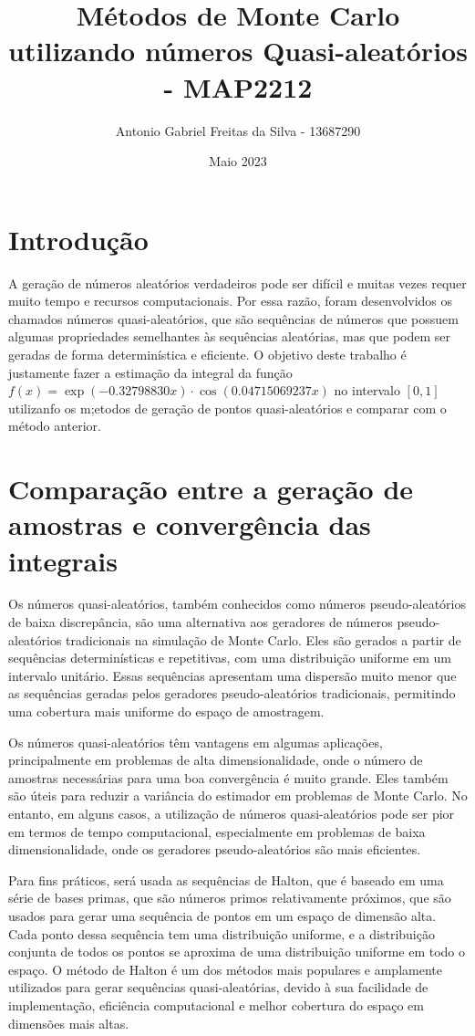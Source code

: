 \documentclass[a4paper]{article}
\title{Métodos de Monte Carlo utilizando números Quasi-aleatórios - MAP2212}
\author{Antonio Gabriel Freitas da Silva - 13687290}
\date{Maio 2023}
\begin{document}
\maketitle

\section{Introdução}

A geração de números aleatórios verdadeiros pode ser difícil e muitas vezes requer muito tempo e recursos computacionais. Por essa razão, foram desenvolvidos os chamados números quasi-aleatórios, que são sequências de números que possuem algumas propriedades semelhantes às sequências aleatórias, mas que podem ser geradas de forma determinística e eficiente. O objetivo deste trabalho é justamente fazer a estimação da integral da função $f(x) = \exp{(-0.32798830x)}\cdot\cos{(0.04715069237x)}$ no intervalo $[0,1]$ utilizanfo os m;etodos de geração de pontos quasi-aleatórios e comparar com o método anterior.

\section{Comparação entre a geração de amostras e convergência das integrais}

Os números quasi-aleatórios, também conhecidos como números pseudo-aleatórios de baixa discrepância, são uma alternativa aos geradores de números pseudo-aleatórios tradicionais na simulação de Monte Carlo. Eles são gerados a partir de sequências determinísticas e repetitivas, com uma distribuição uniforme em um intervalo unitário. Essas sequências apresentam uma dispersão muito menor que as sequências geradas pelos geradores pseudo-aleatórios tradicionais, permitindo uma cobertura mais uniforme do espaço de amostragem.

Os números quasi-aleatórios têm vantagens em algumas aplicações, principalmente em problemas de alta dimensionalidade, onde o número de amostras necessárias para uma boa convergência é muito grande. Eles também são úteis para reduzir a variância do estimador em problemas de Monte Carlo. No entanto, em alguns casos, a utilização de números quasi-aleatórios pode ser pior em termos de tempo computacional, especialmente em problemas de baixa dimensionalidade, onde os geradores pseudo-aleatórios são mais eficientes.

Para fins práticos, será usada as sequências de Halton, que é baseado em uma série de bases primas, que são números primos relativamente próximos, que são usados para gerar uma sequência de pontos em um espaço de dimensão alta. Cada ponto dessa sequência tem uma distribuição uniforme, e a distribuição conjunta de todos os pontos se aproxima de uma distribuição uniforme em todo o espaço.
 O método de Halton é um dos métodos mais populares e amplamente utilizados para gerar sequências quasi-aleatórias, devido à sua facilidade de implementação, eficiência computacional e melhor cobertura do espaço em dimensões mais altas. 
\end{document}

